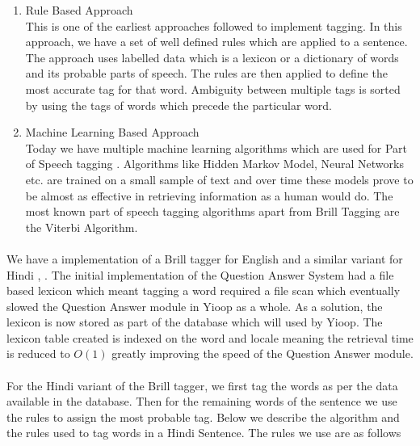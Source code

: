 \begin{enumerate}
\item Rule Based Approach \\
This is one of the earliest approaches followed to implement tagging. In this approach, we have a set of well defined rules which are applied to a sentence. The approach uses labelled data which is a lexicon or a dictionary of words and its probable parts of speech. 
The rules are then applied to define the most accurate tag for that word. Ambiguity between multiple tags is sorted by using the tags of words which precede the particular word.
	
\item Machine Learning Based Approach \\
Today we have multiple machine learning algorithms which are used for Part of Speech tagging  \cite {brill1999unsupervised}. Algorithms like Hidden Markov Model, Neural Networks etc. are trained on a small sample of text and over time these models prove to be almost as effective in retrieving information as a human would do. The most known part of speech tagging algorithms apart from Brill Tagging are the Viterbi Algorithm.
\end{enumerate}

\paragraph{}
We have a implementation of a Brill tagger \cite {brill1992simple} for English and a similar variant for Hindi \cite {garg2012rule}, \cite {dalal2006hindi}.  The initial implementation of the Question Answer System had a file based lexicon which meant tagging a word required a file scan which eventually  slowed the Question Answer module in Yioop as a whole. As a solution, the lexicon is now stored as part of the database which will used by Yioop. The lexicon table created is indexed on the word and locale meaning the retrieval time is reduced to $O(1)$ greatly improving the speed of the Question Answer module. 

\paragraph{}
For the Hindi variant of the Brill tagger, we first tag the words as per the data available in the database. Then for the remaining words of the sentence we use the rules to assign the most probable tag. Below we describe the algorithm and the rules used to tag words in a Hindi Sentence. The rules we use are as follows \\

